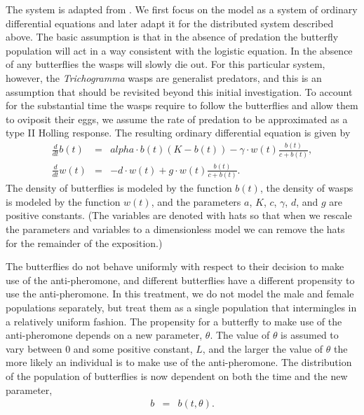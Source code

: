 \documentclass[review,authoryear]{elsarticle}
\def\alpha{alpha}%
\newcommand{\origB}{{b}}
\newcommand{\origW}{{w}}
\newcommand{\origAlpha}{{\alpha}}
\newcommand{\origK}{{K}}
\newcommand{\origGamma}{{\gamma}}
\newcommand{\origA}{{a}}
\newcommand{\origC}{{c}}
\newcommand{\origD}{{d}}
\newcommand{\origG}{{g}}
\newcommand{\origL}{{L}}
\newcommand{\origTheta}{{\theta}}
\newcommand{\origT}{{t}}
\begin{document}
The system is adapted from \cite{TEWA20134825}. We
first focus on the model as a system of ordinary differential
equations and later adapt it for the distributed system described
above. The basic assumption is that in the absence of predation the
butterfly population will act in a way consistent with the logistic
equation. In the absence of any butterflies the wasps will slowly die
out. For this particular system, however, the \textit{Trichogramma}
wasps are generalist predators, and this is an assumption that should
be revisited beyond this initial investigation.  To account for the
substantial time the wasps require to follow the butterflies and allow
them to oviposit their eggs, we assume the rate of predation to be
approximated as a type II Holling response\citep{TEWA20134825}.  The
resulting ordinary differential equation is given by
\begin{eqnarray}
  \label{eq:initialSystem1}
  \frac{d}{d\origT} \origB(\origT) & = & \origAlpha \cdot \origB(\origT) (\origK - \origB(\origT))
                               - \origGamma \cdot \origW(\origT) \frac{\origB(\origT)}{\origC+\origB(\origT)}, \\
  \label{eq:initialSystem2}
  \frac{d}{d\origT} \origW(\origT) & = & -\origD \cdot \origW(\origT) + \origG \cdot \origW(\origT) \frac{\origB(\origT)}{\origC+\origB(\origT)}.
\end{eqnarray}
The density of butterflies is modeled by the function
$\origB(\origT)$, the density of wasps is modeled by the function
$\origW(\origT)$, and the parameters $\origA$, $\origK$, $\origC$,
$\origGamma$, $\origD$, and $\origG$ are positive constants. (The variables are denoted with hats so that when we rescale the parameters and variables to a dimensionless model we can remove the hats for the remainder of the exposition.)
 
The butterflies do not behave uniformly with respect to their decision
to make use of the anti-pheromone, and different butterflies have a
different propensity to use the anti-pheromone. In this treatment, we
do not model the male and female populations separately, but treat
them as a single population that intermingles in a relatively uniform
fashion. The propensity for a butterfly to make use of the
anti-pheromone depends on a new parameter, $\origTheta$. The value of
$\origTheta$ is assumed to vary between $0$ and some positive constant,
$\origL$, and the larger the value of $\origTheta$ the more likely an
individual is to make use of the anti-pheromone. The distribution of
the population of butterflies is now dependent on both the time and
the new parameter,
\begin{eqnarray}
  \origB & = & \origB(\origT,\origTheta).
\end{eqnarray}
\end{document}
